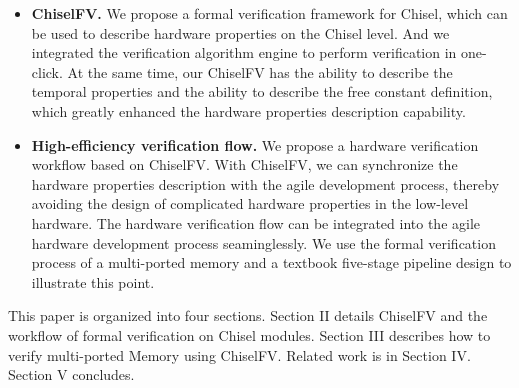 \documentclass[conference]{IEEEtran}
\theoremstyle{definition}
\begin{document}
\begin{itemize}
    \item \textbf{ChiselFV.} We propose a formal verification framework for Chisel, which can be used to describe hardware properties on the Chisel level. And we integrated the verification algorithm engine to perform verification in one-click. At the same time, our ChiselFV has the ability to describe the temporal properties and the ability to describe the free constant definition, which greatly enhanced the hardware properties description capability.
    \item \textbf{High-efficiency verification flow.} We propose a hardware verification workflow based on ChiselFV. With ChiselFV, we can synchronize the hardware properties description with the agile development process, thereby avoiding the design of complicated hardware properties in the low-level hardware. The hardware verification flow can be integrated into the agile hardware development process seaminglessly. 
    We use the formal verification process of a multi-ported memory and a textbook five-stage pipeline design to illustrate this point.
\end{itemize}

This paper is organized into four sections. 
Section II details ChiselFV and the workflow of formal verification on Chisel modules. Section III describes how to verify multi-ported Memory using ChiselFV. Related work is in Section IV. Section V concludes.



\end{document}
